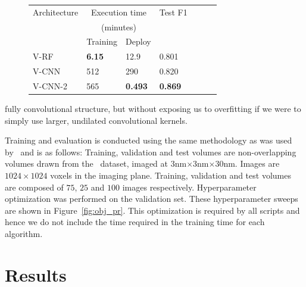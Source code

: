 \documentclass{article}
\begin{document}
\begin{figure}
  \begin{minipage}[h]{\linewidth}
    \centering
	\begin{tabular}{@{}lllllll@{}}
		\toprule
		Architecture 							& \multicolumn{2}{c}{Execution time} 	& Test F1 										\\
 														& 	\multicolumn{2}{c}{(minutes)}			& 														\\
 		\cmidrule{2-3}
 														& Training					& Deploy					& \\
		\midrule
		V-RF				 							& \textbf{6.15}	 	&  12.9					& 0.801												\\
		V-CNN										& 512 						&  290 					& 0.820											\\	
		V-CNN-2				  					& 565		          		&  \textbf{0.493}	& \textbf{0.869}								\\
		\bottomrule			
	\end{tabular}							
	\label{tab:results}
 \end{minipage}%
 \end{figure}
\noindent fully convolutional structure, but without exposing us to overfitting if we were to simply use larger, undilated convolutional kernels.

Training and evaluation is conducted using the same methodology as was used by~\citet{roncal2014vesicle} and is as follows:
Training, validation and test volumes are non-overlapping volumes drawn from the~\citet{kasthuri2015saturated} dataset, imaged at $3$nm$\times3$nm$\times30$nm.
Images are $1024\times1024$ voxels in the imaging plane.
Training, validation and test volumes are composed of $75$, $25$ and $100$ images respectively.
Hyperparameter optimization was performed on the validation set.
These hyperparameter sweeps are shown in Figure~\ref{fig:obj_pr}.
This optimization is required by all scripts and hence we do not include the time required in the training time for each algorithm.


\section*{Results}
\label{sec:results}
\end{document}
